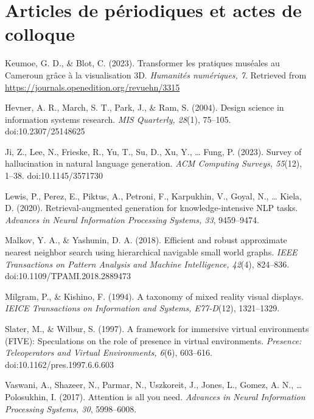 \section*{Articles de périodiques et actes de colloque}

\begin{apalist}
\item Keumoe, G. D., \& Blot, C. (2023). Transformer les pratiques muséales au
      Cameroun grâce à la visualisation 3D. \emph{Humanités numériques, 7}.
      Retrieved from \url{https://journals.openedition.org/revuehn/3315}

\item Hevner, A. R., March, S. T., Park, J., \& Ram, S. (2004). Design science in
      information systems research. \emph{MIS Quarterly, 28}(1), 75--105.
      doi:10.2307/25148625

\item Ji, Z., Lee, N., Frieske, R., Yu, T., Su, D., Xu, Y., \ldots{} Fung, P.
      (2023). Survey of hallucination in natural language generation. \emph{ACM
      Computing Surveys, 55}(12), 1--38. doi:10.1145/3571730

\item Lewis, P., Perez, E., Piktus, A., Petroni, F., Karpukhin, V., Goyal, N.,
      \ldots{} Kiela, D. (2020). Retrieval-augmented generation for
      knowledge-intensive NLP tasks. \emph{Advances in Neural Information
      Processing Systems, 33}, 9459--9474.

\item Malkov, Y. A., \& Yashunin, D. A. (2018). Efficient and robust approximate
      nearest neighbor search using hierarchical navigable small world graphs.
      \emph{IEEE Transactions on Pattern Analysis and Machine Intelligence,
      42}(4), 824--836. doi:10.1109/TPAMI.2018.2889473

\item Milgram, P., \& Kishino, F. (1994). A taxonomy of mixed reality visual
      displays. \emph{IEICE Transactions on Information and Systems, E77-D}(12),
      1321--1329.

\item Slater, M., \& Wilbur, S. (1997). A framework for immersive virtual
      environments (FIVE): Speculations on the role of presence in virtual
      environments. \emph{Presence: Teleoperators and Virtual Environments,
      6}(6), 603--616. doi:10.1162/pres.1997.6.6.603

\item Vaswani, A., Shazeer, N., Parmar, N., Uszkoreit, J., Jones, L., Gomez,
      A. N., \ldots{} Polosukhin, I. (2017). Attention is all you need.
      \emph{Advances in Neural Information Processing Systems, 30}, 5998--6008.
\end{apalist}

